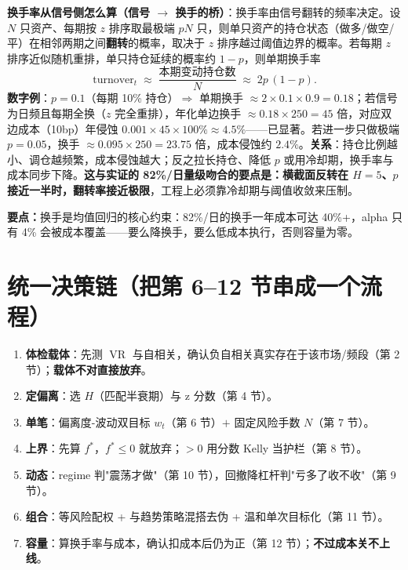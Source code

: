 \documentclass[UTF8,11pt]{ctexart}
\newcommand{\takeaway}[1]{\medskip\par\noindent\textbf{要点：}#1\par\medskip}
\begin{document}
\textbf{换手率从信号侧怎么算（信号 $\to$ 换手的桥）}：换手率由信号翻转的频率决定。设 $N$ 只资产、每期按 $z$ 排序取最极端 $pN$ 只，则单只资产的持仓状态（做多/做空/平）在相邻两期之间\textbf{翻转}的概率，取决于 $z$ 排序越过阈值边界的概率。若每期 $z$ 排序近似随机重排，单只持仓延续的概率约 $1-p$，则单期换手率
\begin{equation}
\text{turnover}_t \;\approx\; \frac{\text{本期变动持仓数}}{N} \;\approx\; 2p\,(1-p).
\end{equation}
\textbf{数字例}：$p=0.1$（每期 10\% 持仓）$\Rightarrow$ 单期换手 $\approx2\times0.1\times0.9=0.18$；若信号为日频且每期全换（$z$ 完全重排），年化单边换手 $\approx0.18\times250=45$ 倍，对应双边成本（10bp）年侵蚀 $0.001\times45\times100\%\approx4.5\%$——已显著。若进一步只做极端 $p=0.05$，换手 $\approx0.095\times250=23.75$ 倍，成本侵蚀约 $2.4\%$。\textbf{关系}：持仓比例越小、调仓越频繁，成本侵蚀越大；反之拉长持仓、降低 $p$ 或用冷却期，换手率与成本同步下降。\textbf{这与实证的 82\%/日量级吻合的要点是：横截面反转在 $H=5$、$p$ 接近一半时，翻转率接近极限}，工程上必须靠冷却期与阈值收敛来压制。

\takeaway{换手是均值回归的核心约束：82\%/日的换手一年成本可达 40\%+，alpha 只有 4\% 会被成本覆盖——要么降换手，要么低成本执行，否则容量为零。}

\section{统一决策链（把第 6--12 节串成一个流程）}
\begin{enumerate}[itemsep=2pt]
\item \textbf{体检载体}：先测 $\operatorname{VR}$ 与自相关，确认负自相关真实存在于该市场/频段（第 2 节）；\textbf{载体不对直接放弃}。
\item \textbf{定偏离}：选 $H$（匹配半衰期）与 z 分数（第 4 节）。
\item \textbf{单笔}：偏离度-波动双目标 $w_t$（第 6 节）$+$ 固定风险手数 $N$（第 7 节）。
\item \textbf{上界}：先算 $f^{*}$，$f^{*}\le0$ 就放弃；$>0$ 用分数 Kelly 当护栏（第 8 节）。
\item \textbf{动态}：regime 判"震荡才做"（第 10 节），回撤降杠杆判"亏多了收不收"（第 9 节）。
\item \textbf{组合}：等风险配权 + 与趋势策略混搭去伪 + 温和单次目标化（第 11 节）。
\item \textbf{容量}：算换手率与成本，确认扣成本后仍为正（第 12 节）；\textbf{不过成本关不上线}。
\end{enumerate}
\end{document}
